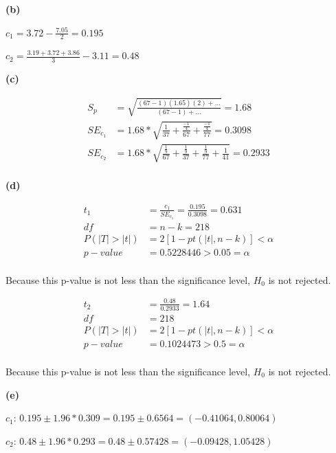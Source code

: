 \documentclass[11pt]{article}
\renewcommand\part[1]{\vspace{.10in}\textbf{(#1)}\par}
\begin{document}
	\part{b}
		$c_{1} = 3.72 - \frac{7.05}{2} = 0.195$\par
		$c_{2} = \frac{3.19 + 3.72 + 3.86}{3} - 3.11= 0.48$\par	
	
	\part{c}
		\begin{align*}
			S_{p} &= \sqrt{ \frac{ (67-1)(1.65)(2) + ... }{ (67-1) + ... } } = 1.68\\
			SE_{c_{1}} &= 1.68 * \sqrt{\frac{1}{37}+ \frac{\frac{-1}{4}}{67} + \frac{\frac{-1}{4}}{77}} = 0.3098\\
			SE_{c_{2}} &= 1.68 * \sqrt{  \frac{\frac{1}{9}}{67} + \frac{\frac{1}{9}}{37} + \frac{\frac{1}{9}}{77} + \frac{1}{41}} = 0.2933\\
		\end{align*}\par
	
	\part{d}
		\begin{align*}
			t_{1} &= \frac{c_{1}}{SE_{c_{1}}} = \frac{0.195}{0.3098} = 0.631\\
			df &= n-k =218\\
			P(|T| > |t|) &= 2[1-pt(|t|, n-k)] < \alpha \\
			p-value &= 0.5228446 > 0.05 = \alpha\\
		\end{align*}\par
		Because this p-value is not less than the significance level, $H_{0}$ is not rejected.\par
		\begin{align*}
			t_{2} &= \frac{0.48}{0.2933} = 1.64\\
			df &= 218\\
			P(|T| > |t|) &= 2[1-pt(|t|, n-k)] < \alpha \\
			p-value &= 0.1024473 > 0.5 = \alpha\\
		\end{align*}\par
		Because this p-value is not less than the significance level, $H_{0}$ is not rejected.\par
	
	\part{e}
		$c_{1}$:
		$0.195 \pm 1.96 * 0.309 = 0.195 \pm 0.6564 = (-0.41064, 0.80064)$\par
		$c_{2}$:
		$0.48 \pm 1.96 * 0.293 = 0.48 \pm 0.57428 = (-0.09428, 1.05428)$\par
\end{document}

